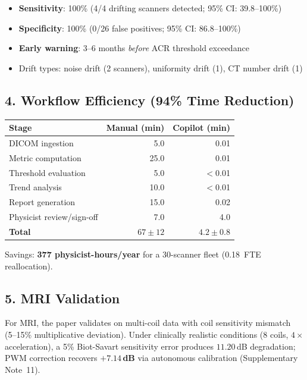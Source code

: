 \documentclass[11pt]{article}
\begin{document}
\begin{itemize}
  \item \textbf{Sensitivity}: 100\% (4/4 drifting scanners detected; 95\% CI: 39.8--100\%)
  \item \textbf{Specificity}: 100\% (0/26 false positives; 95\% CI: 86.8--100\%)
  \item \textbf{Early warning}: 3--6 months \emph{before} ACR threshold exceedance
  \item Drift types: noise drift (2 scanners), uniformity drift (1), CT number drift (1)
\end{itemize}

\subsection*{4. Workflow Efficiency (94\% Time Reduction)}

\begin{center}
\begin{tabular}{lrr}
\toprule
\textbf{Stage} & \textbf{Manual (min)} & \textbf{Copilot (min)} \\
\midrule
DICOM ingestion          & 5.0   & 0.01 \\
Metric computation       & 25.0  & 0.01 \\
Threshold evaluation     & 5.0   & $<$0.01 \\
Trend analysis           & 10.0  & $<$0.01 \\
Report generation        & 15.0  & 0.02 \\
Physicist review/sign-off & 7.0  & 4.0 \\
\midrule
\textbf{Total}           & $67 \pm 12$ & $4.2 \pm 0.8$ \\
\bottomrule
\end{tabular}
\end{center}

\noindent Savings: \textbf{377 physicist-hours/year} for a 30-scanner fleet (0.18~FTE reallocation).

\subsection*{5. MRI Validation}

For MRI, the paper validates on multi-coil data with coil sensitivity mismatch (5--15\% multiplicative deviation).  Under clinically realistic conditions (8 coils, $4\times$ acceleration), a 5\% Biot-Savart sensitivity error produces $11.20$\,dB degradation; PWM correction recovers \textbf{$+7.14$\,dB} via autonomous calibration (Supplementary Note~11).
\end{document}
